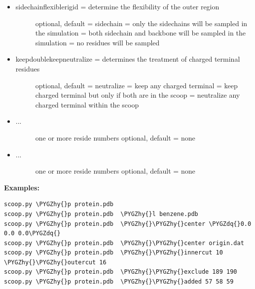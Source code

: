 \documentclass[letterpaper,10pt,english]{sphinxmanual}
\def\PYGZhy{\char`\-}
\def\PYGZdq{\char`\"}
\begin{document}
\begin{itemize}
\begin{description}
\end{description}

\item {} \begin{description}
\item[{ sidechain\textbar{}flexible\textbar{}rigid = determine the flexibility of the outer region}] \leavevmode
optional, default = sidechain
 = only the sidechains will be sampled in the simulation
 = both sidechain and backbone will be sampled in the simulation
 = no residues will be sampled

\end{description}

\item {} \begin{description}
\item[{ keep\textbar{}doublekeep\textbar{}neutralize = determines the treatment of charged terminal residues}] \leavevmode
optional, default = neutralize
 = keep any charged terminal
 = keep charged terminal but only if both are in the scoop
 = neutralize any charged terminal within the scoop

\end{description}

\item {} \begin{description}
\item[{ ...}] \leavevmode
one or more reside numbers
optional, default = none

\end{description}

\item {} \begin{description}
\item[{ ...}] \leavevmode
one or more reside numbers
optional, default = none

\end{description}

\end{itemize}

\textbf{Examples:}

\begin{Verbatim}[commandchars=\\\{\}]
scoop.py \PYGZhy{}p protein.pdb
scoop.py \PYGZhy{}p protein.pdb  \PYGZhy{}l benzene.pdb
scoop.py \PYGZhy{}p protein.pdb  \PYGZhy{}\PYGZhy{}center \PYGZdq{}0.0 0.0 0.0\PYGZdq{}
scoop.py \PYGZhy{}p protein.pdb  \PYGZhy{}\PYGZhy{}center origin.dat
scoop.py \PYGZhy{}p protein.pdb  \PYGZhy{}\PYGZhy{}innercut 10 \PYGZhy{}\PYGZhy{}outercut 16
scoop.py \PYGZhy{}p protein.pdb  \PYGZhy{}\PYGZhy{}exclude 189 190
scoop.py \PYGZhy{}p protein.pdb  \PYGZhy{}\PYGZhy{}added 57 58 59
\end{Verbatim}
\end{document}
